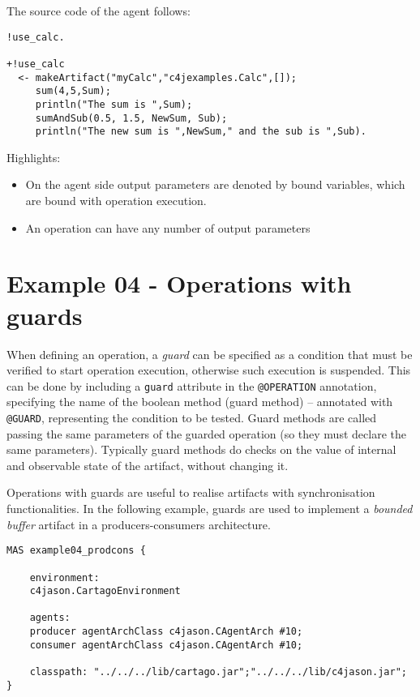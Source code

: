 \documentclass[11pt]{report}
\newcommand\code[1]{{\small{\mbox{\texttt{{#1}}}}}}
\begin{document}
%
\noindent The source code of the agent follows:

%
{\small{
\begin{verbatim}
!use_calc.

+!use_calc 
  <- makeArtifact("myCalc","c4jexamples.Calc",[]);
     sum(4,5,Sum);
     println("The sum is ",Sum);
     sumAndSub(0.5, 1.5, NewSum, Sub);
     println("The new sum is ",NewSum," and the sub is ",Sub).\end{verbatim}}}

%
\noindent Highlights:
\begin{itemize}
\item On the agent side output parameters are denoted by bound variables, which are bound with operation execution.
\item An operation can have any number of  output parameters
\end{itemize} 


\newpage
\section{Example 04 - Operations with guards }

When defining an operation, a \emph{guard} can be specified as a condition that must be verified to start operation execution, otherwise such execution is suspended.
%
This can be done by including a \code{guard} attribute in the \code{@OPERATION} annotation, specifying the name of the boolean method (guard method) -- annotated with \code{@GUARD}, representing the condition to be tested.
%
Guard methods are called passing the same parameters of the guarded operation (so they must declare the same parameters).
%
Typically guard methods do checks on the value of internal and observable state of the artifact, without changing it.

Operations with guards are useful to realise artifacts with synchronisation functionalities.
%
In the following example, guards are used to implement a \emph{bounded buffer} artifact in a producers-consumers architecture.

{\small{
\begin{verbatim}
MAS example04_prodcons {

    environment: 
    c4jason.CartagoEnvironment

    agents:  
    producer agentArchClass c4jason.CAgentArch #10;
    consumer agentArchClass c4jason.CAgentArch #10;

    classpath: "../../../lib/cartago.jar";"../../../lib/c4jason.jar";    
}
\end{verbatim}}}
\end{document}
